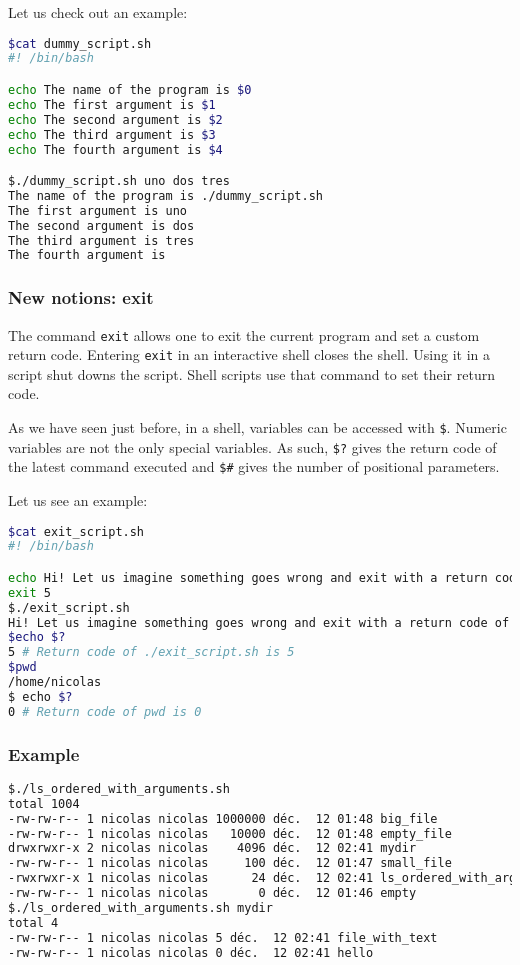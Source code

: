 \documentclass[12pt]{article}
\begin{document}
Let us check out an example:

\begin{lstlisting}[language=bash]
$cat dummy_script.sh 
#! /bin/bash

echo The name of the program is $0
echo The first argument is $1
echo The second argument is $2
echo The third argument is $3
echo The fourth argument is $4

$./dummy_script.sh uno dos tres
The name of the program is ./dummy_script.sh
The first argument is uno
The second argument is dos
The third argument is tres
The fourth argument is
\end{lstlisting}

\subsubsection{New notions: exit}

The command \texttt{exit} allows one to exit the current program and set a custom return code. Entering \texttt{exit} in an interactive shell closes the shell. Using it in a script shut downs the script. Shell scripts use that command to set their return code.

As we have seen just before, in a shell, variables can be accessed with \texttt{\$}. Numeric variables are not the only special variables. As such, \texttt{\$?} gives the return code of the latest command executed and \texttt{\$\#} gives the number of positional parameters.

Let us see an example:
\begin{lstlisting}[language=bash]
$cat exit_script.sh 
#! /bin/bash

echo Hi! Let us imagine something goes wrong and exit with a return code of 5
exit 5
$./exit_script.sh 
Hi! Let us imagine something goes wrong and exit with a return code of 5
$echo $?
5 # Return code of ./exit_script.sh is 5
$pwd
/home/nicolas
$ echo $?
0 # Return code of pwd is 0
\end{lstlisting}

\subsubsection{Example}

\begin{lstlisting}[language=bash]
$./ls_ordered_with_arguments.sh 
total 1004
-rw-rw-r-- 1 nicolas nicolas 1000000 déc.  12 01:48 big_file
-rw-rw-r-- 1 nicolas nicolas   10000 déc.  12 01:48 empty_file
drwxrwxr-x 2 nicolas nicolas    4096 déc.  12 02:41 mydir
-rw-rw-r-- 1 nicolas nicolas     100 déc.  12 01:47 small_file
-rwxrwxr-x 1 nicolas nicolas      24 déc.  12 02:41 ls_ordered_with_arguments.sh
-rw-rw-r-- 1 nicolas nicolas       0 déc.  12 01:46 empty
$./ls_ordered_with_arguments.sh mydir
total 4
-rw-rw-r-- 1 nicolas nicolas 5 déc.  12 02:41 file_with_text
-rw-rw-r-- 1 nicolas nicolas 0 déc.  12 02:41 hello
\end{lstlisting}
\end{document}
